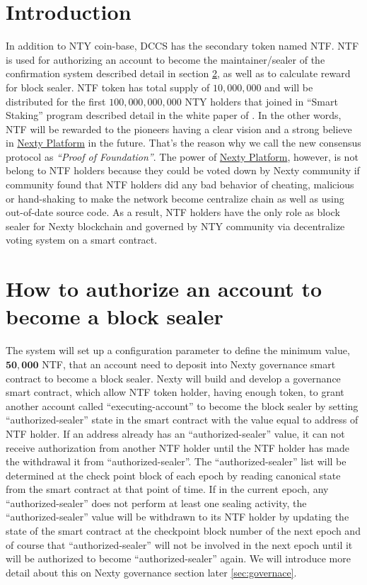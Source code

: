 \documentclass[12pt,oneside]{amsart}
\begin{document}
\setlength{\columnsep}{20pt}
\begin{multicols}{2}

\section{Introduction}\label{sec:introduction}
In addition to {\small NTY} coin-base, {\small DCCS} has the secondary token named {\small NTF}. {\small NTF} is used for authorizing an account to become the maintainer/sealer of the confirmation system described detail in section \ref{sec:authorize}, as well as to calculate reward for block sealer. {\small NTF} token has total supply of $10,000,000$ and will be distributed for the first $100,000,000,000$ NTY holders that joined in ``Smart Staking'' program described detail in the white paper of \cite{smart-taking}. In the other words, {\small NTF} will be rewarded to the pioneers having a clear vision and a strong believe in \href{https://nexty.io}{Nexty Platform} in the future. That's the reason why we call the new consensus protocol as \textit{``Proof of Foundation''}. The power of \href{https://nexty.io}{Nexty Platform}, however, is not belong to {\small NTF} holders because they could be voted down by Nexty community if community found that {\small NTF} holders did any bad behavior of cheating, malicious or hand-shaking to make the network become centralize chain as well as using out-of-date source code. As a result, {\small NTF} holders have the only role as block sealer for Nexty blockchain and governed  by {\small NTY} community via decentralize voting system on a smart contract.

\section{How to authorize an account to become a block sealer}\label{sec:authorize}
The system will set up a configuration parameter to define the minimum value, $\mathbf{50,000}$ {\small NTF}, that an account need to deposit into Nexty governance smart contract to become a block sealer. Nexty will build and develop a governance smart contract, which allow {\small NTF} token holder, having enough token, to grant another account called ``executing-account'' to become the block sealer by setting ``authorized-sealer'' state in the smart contract with the value equal to address of {\small NTF} holder. If an address already has an ``authorized-sealer'' value, it can not receive authorization from another NTF holder until the NTF holder has made the withdrawal it from ``authorized-sealer''. The ``authorized-sealer'' list will be determined at the check point block of each epoch by reading canonical state from the smart contract at that point of time. If in the current epoch, any ``authorized-sealer'' does not perform at least one sealing activity, the ``authorized-sealer'' value will be withdrawn to its {\small NTF} holder by updating the state of the smart contract at the checkpoint block number of the next epoch and of course that ``authorized-sealer'' will not be involved in the next epoch until it will be authorized to become ``authorized-sealer'' again. We will introduce more detail about this on Nexty governance section later \ref{sec:governace}.


\end{multicols}
\end{document}
